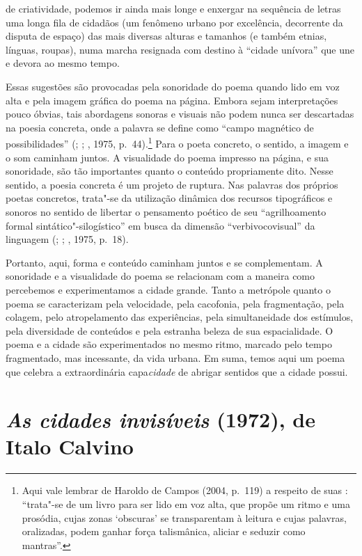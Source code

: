 de criatividade, podemos ir ainda mais longe e enxergar na sequência de
letras uma longa fila de cidadãos (um fenômeno urbano por excelência,
decorrente da disputa de espaço) das mais diversas alturas e tamanhos (e
também etnias, línguas, roupas), numa marcha resignada com destino à
``cidade unívora'' que une e devora ao mesmo tempo.

Essas sugestões são provocadas pela sonoridade do poema quando lido em
voz alta e pela imagem gráfica do poema na página. Embora sejam
interpretações pouco óbvias, tais abordagens sonoras e visuais não podem
nunca ser descartadas na poesia concreta, onde a palavra se define como
``campo magnético de possibilidades'' (; ; , 1975,
p.~44).\footnote{Aqui vale lembrar de Haroldo de Campos (2004, p.~119) a
  respeito de suas {}: ``trata"-se de um livro para ser lido
  em voz alta, que propõe um ritmo e uma prosódia, cujas zonas
  `obscuras' se transparentam à leitura e cujas palavras, oralizadas,
  podem ganhar força talismânica, aliciar e seduzir como mantras''.}
Para o poeta concreto, o sentido, a imagem e o som caminham juntos. A
visualidade do poema impresso na página, e sua sonoridade, são tão
importantes quanto o conteúdo propriamente dito. Nesse sentido, a poesia
concreta é um projeto de ruptura. Nas palavras dos próprios poetas
concretos, trata"-se da utilização dinâmica dos recursos tipográficos e
sonoros no sentido de libertar o pensamento poético de seu
``agrilhoamento formal sintático"-silogístico'' em busca da dimensão
``verbivocovisual'' da linguagem (; ; , 1975, p.~18).

Portanto, aqui, forma e conteúdo caminham juntos e se complementam. A
sonoridade e a visualidade do poema se relacionam com a maneira como
percebemos e experimentamos a cidade grande. Tanto a metrópole quanto o
poema se caracterizam pela velocidade, pela cacofonia, pela
fragmentação, pela colagem, pelo atropelamento das experiências, pela
simultaneidade dos estímulos, pela diversidade de conteúdos e pela
estranha beleza de sua espacialidade. O poema e a cidade são
experimentados no mesmo ritmo, marcado pelo tempo fragmentado, mas
incessante, da vida urbana. Em suma, temos aqui um poema que celebra a
extraordinária capa\emph{cidade} de abrigar sentidos que a cidade
possui.

\chapter{\emph{As cidades invisíveis} (1972), de Italo Calvino}

